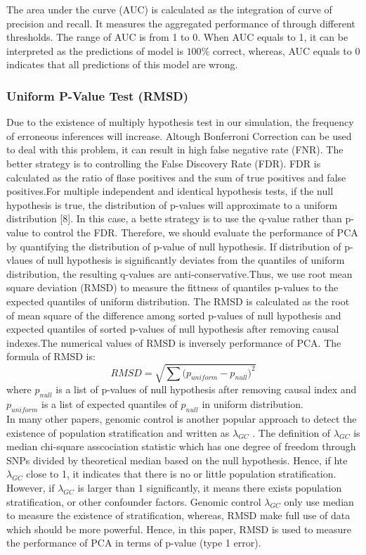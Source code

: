 \documentclass[12pt]{article}
\begin{document}
The area under the curve (AUC) is calculated as the integration of curve of precision and recall. It measures the aggregated performance of through diﬀerent thresholds. The range of AUC is from 1 to 0. When AUC equals to 1, it can be interpreted as the predictions of model is $100\%$ correct, whereas, AUC equals to 0 indicates that all predictions of this model are wrong. 
\subsubsection{Uniform P-Value Test (RMSD)}
Due to the existence of multiply hypothesis test in our simulation, the frequency of erroneous inferences will increase. Altough Bonferroni Correction can be used to deal with this problem, it can result in high false negative rate (FNR). The better strategy is to controlling the False Discovery Rate (FDR). FDR is calculated as the ratio of flase positives and the sum of true positives and false positives.For multiple independent and identical hypothesis tests, if the null hypothesis is true, the distribution of p-values will approximate to a uniform distribution [8]. In this case, a bette strategy is to use the q-value rather than p-value to control the FDR. Therefore, we should evaluate the performance of PCA by quantifying the distribution of p-value of null hypothesis. If distribution of p-vlaues of null hypothesis is significantly deviates from the quantiles of uniform distribution, the resulting q-values are anti-conservative.Thus, we use root mean square deviation (RMSD) to measure the fittness of quantiles p-values to the expected quantiles of uniform distribution. The RMSD is calculated as the root of mean square of the difference among sorted p-values of null hypothesis and expected quantiles of sorted p-values of null hypothesis after removing causal indexes.The numerical values of RMSD is inversely  performance of PCA. The formula of RMSD is:
$$RMSD=\sqrt{\sum{(p_{uniform}-p_{null}})^2}$$
where $p_{null}$ is a list of p-values of null hypothesis after removing causal index and $p_{uniform}$ is a list of expected quantiles of $p_{null}$ in uniform distribution. \\

In many other papers, genomic control is another popular approach to detect the existence of population stratification and written as $\lambda_{GC}$ . The definition of $\lambda_{GC}$ is median chi-square asscociation statistic which has one degree of freedom through SNPs divided by theoretical median based on the null hypothesis. Hence, if hte $\lambda_{GC}$ close to 1, it indicates that there is no or little population stratification. However, if $\lambda_{GC}$ is larger than 1 significantly, it means there exists population stratification, or other confounder factors. Genomic control $\lambda_{GC}$ only use median to measure the existence of stratification, whereas, RMSD make full use of data which should be more powerful. Hence, in this paper, RMSD is used to measure the performance of PCA in terms of p-value (type 1 error).
\end{document}
